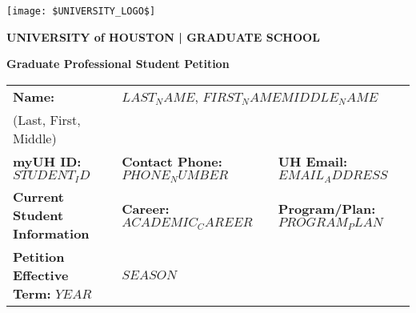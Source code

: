 \documentclass[12pt]{article}
\newcommand{\firstName}{$FIRST_NAME$}
\newcommand{\lastName}{$LAST_NAME$}
\newcommand{\middleName}{$MIDDLE_NAME$}
\newcommand{\studentID}{$STUDENT_ID$}
\newcommand{\phoneNumber}{$PHONE_NUMBER$}
\newcommand{\emailAddress}{$EMAIL_ADDRESS$}
\newcommand{\programPlan}{$PROGRAM_PLAN$}
\newcommand{\academicCareer}{$ACADEMIC_CAREER$}
\newcommand{\yearValue}{$YEAR$}
\newcommand{\seasonValue}{$SEASON$}
\begin{document}
\thispagestyle{empty}

\begin{center}
  \texttt{[image: \$UNIVERSITY\_LOGO\$]}
  \vspace{1em}
\end{center}

\begin{center}
  \textbf{\huge \color{gray} UNIVERSITY of \color{red} HOUSTON \color{darkgray} | GRADUATE SCHOOL}
\end{center}

\textbf{\LARGE Graduate Professional Student Petition} 
\vspace{1.5em}

\begin{tabular}{|p{}|p{}|p{}|}
\hline
\textbf{Name:} & \multicolumn{2}{l|}{\lastName, \firstName \middleName} \\
\scriptsize (Last, First, Middle) & \multicolumn{2}{l|}{} \\
\hline
\textbf{myUH ID:} \studentID & \textbf{Contact Phone:} \phoneNumber & \textbf{UH Email:} \emailAddress \\
\hline
\textbf{Current Student Information} & \textbf{Career:} \academicCareer & \textbf{Program/Plan:} \programPlan \\
\hline
\textbf{Petition Effective Term:} \yearValue & \multicolumn{2}{l|}{\seasonValue} \\
\hline
\end{tabular}
\vspace{0.5em}
\end{document}
